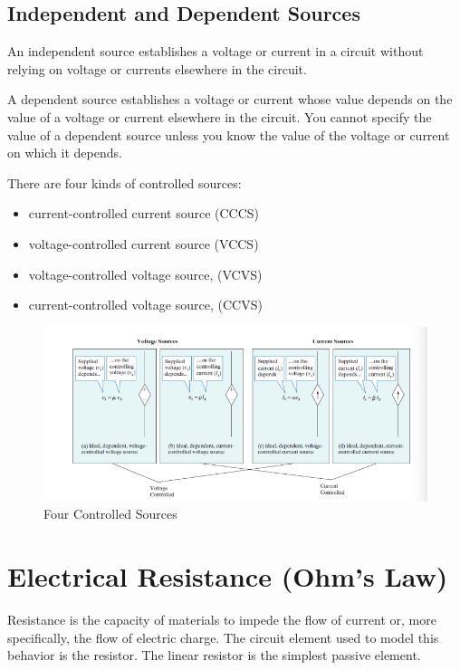 \documentclass[14pt]{memoir}
\begin{document}
\subsection{Independent and Dependent Sources}

An independent source establishes a voltage or current in a circuit without relying on voltage or currents elsewhere in the circuit. 

A dependent source establishes a voltage or current whose value depends on the value of a voltage or current elsewhere in the circuit. You cannot specify the value of a dependent source unless you know the value of the voltage or current on which it depends.

There are four kinds of controlled sources:
\begin{itemize}
\item current-controlled current source (CCCS)
\item voltage-controlled current source (VCCS)
\item voltage-controlled voltage source, (VCVS)
\item current-controlled voltage source, (CCVS)
\end{itemize}

\begin{figure}[h]
\begin{center}
\includegraphics[scale=0.60]{fig/fig02_02.png}
\caption{Four Controlled Sources}
\label{fig:f02_02}
\end{center}
\end{figure}

\section{Electrical Resistance (Ohm's Law)}
Resistance is the capacity of materials to impede the flow of current or, more specifically, the flow of electric charge. The circuit element used to model this behavior is the resistor. The linear resistor is the simplest passive element.
\end{document}
